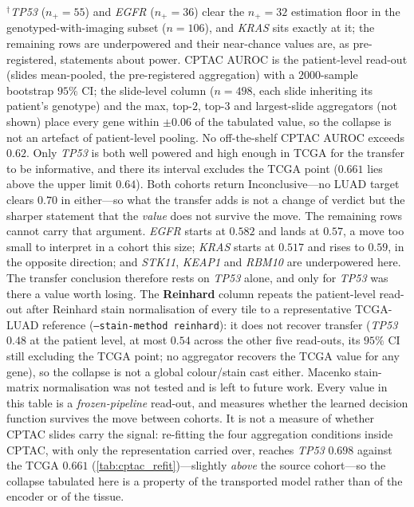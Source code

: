 \begin{flushleft}\footnotesize
$^\dagger$\textit{TP53} ($n_+\!=\!55$) and \textit{EGFR} ($n_+\!=\!36$)
clear the $n_+\!=\!32$ estimation floor in the
genotyped-with-imaging subset ($n\!=\!106$), and \textit{KRAS} sits
exactly at it; the remaining rows are underpowered
and their near-chance values are, as pre-registered, statements about power.
CPTAC AUROC is the patient-level read-out (slides mean-pooled, the
pre-registered aggregation) with a $2000$-sample bootstrap $95\%$ CI; the
slide-level column ($n\!=\!498$, each slide inheriting its patient's genotype)
and the max, top-$2$, top-$3$ and largest-slide aggregators (not shown) place
every gene within $\pm0.06$ of the tabulated value, so the collapse is not an
artefact of patient-level pooling. No off-the-shelf CPTAC AUROC exceeds $0.62$.
Only \textit{TP53} is both well powered and high enough in TCGA for the
transfer to be informative, and there its interval excludes the TCGA point
($0.661$ lies above the upper limit $0.64$). Both cohorts return
Inconclusive---no LUAD target clears $0.70$ in either---so what the transfer
adds is not a change of verdict but the sharper statement that the
\emph{value} does not survive the move.
The remaining rows cannot carry that argument. \textit{EGFR} starts at
$0.582$ and lands at $0.57$, a move too small to interpret in a cohort this
size; \textit{KRAS} starts at $0.517$ and rises to $0.59$, in the opposite
direction; and \textit{STK11}, \textit{KEAP1} and \textit{RBM10} are
underpowered here. The transfer conclusion therefore rests on \textit{TP53}
alone, and only for \textit{TP53} was there a value worth losing. The \textbf{Reinhard} column
repeats the patient-level read-out after Reinhard stain normalisation of every
tile to a representative TCGA-LUAD reference
(\texttt{--stain-method reinhard}): it does not recover transfer
(\textit{TP53} $0.48$ at the patient level, at most $0.54$ across the other
five read-outs, its $95\%$ CI still excluding the TCGA point; no aggregator
recovers the TCGA value for any gene), so the collapse is not a global
colour/stain cast either. Macenko stain-matrix normalisation was
not tested and is left to future work.
Every value in this table is a \emph{frozen-pipeline} read-out, and measures
whether the learned decision function survives the move between cohorts. It
is not a measure of whether CPTAC slides carry the signal: re-fitting the four
aggregation conditions inside CPTAC, with only the representation carried
over, reaches \textit{TP53} $0.698$ against the TCGA $0.661$
(\cref{tab:cptac_refit})---slightly \emph{above} the source cohort---so the
collapse tabulated here is a property of the transported model rather than of
the encoder or of the tissue.
\end{flushleft}
